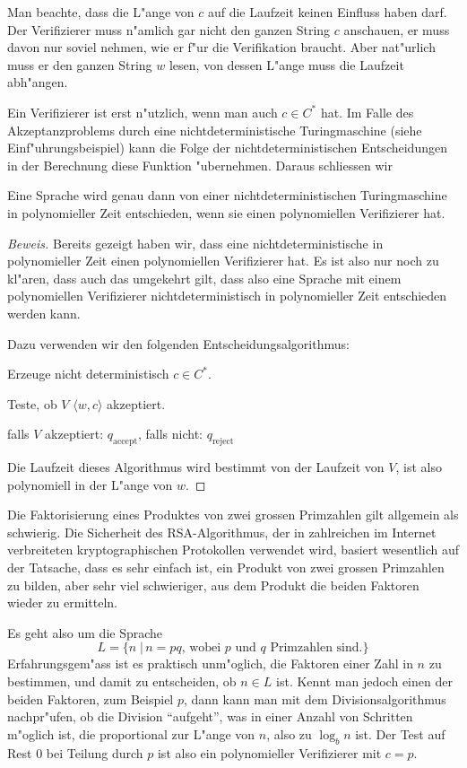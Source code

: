 Man beachte, dass die L"ange von $c$ auf die Laufzeit keinen
Einfluss haben darf. Der Verifizierer muss n"amlich gar nicht
den ganzen String $c$ anschauen, er muss davon nur soviel
nehmen, wie er f"ur die Verifikation braucht. Aber nat"urlich
muss er den ganzen String $w$ lesen, von dessen L"ange muss
die Laufzeit abh"angen.

Ein Verifizierer ist erst n"utzlich, wenn man auch $c\in C^*$
hat. Im Falle des Akzeptanzproblems durch eine nichtdeterministische
Turingmaschine (siehe Einf"uhrungsbeispiel) kann die Folge der
nichtdeterministischen Entscheidungen in der Berechnung diese
Funktion "ubernehmen. Daraus schliessen wir

\begin{satz} Eine Sprache wird genau dann von einer
nichtdeterministischen Turingmaschine in polynomieller Zeit entschieden,
wenn sie einen polynomiellen Verifizierer hat.
\end{satz}

\begin{proof}[Beweis]
Bereits gezeigt haben wir, dass eine nichtdeterministische in
polynomieller Zeit einen polynomiellen Verifizierer hat. Es ist also
nur noch zu kl"aren, dass auch das umgekehrt gilt, dass also eine
Sprache mit einem polynomiellen Verifizierer nichtdeterministisch
in polynomieller Zeit entschieden werden kann.

Dazu verwenden wir den folgenden Entscheidungsalgorithmus:
\begin{compactenum}
\item Erzeuge nicht deterministisch $c\in C^*$.
\item Teste, ob $V$ $\langle w,c\rangle$ akzeptiert.
\item falls $V$ akzeptiert: $q_{\text{accept}}$, falls nicht:
$q_{\text{reject}}$
\end{compactenum}
Die Laufzeit dieses Algorithmus wird bestimmt von der Laufzeit von $V$,
ist also polynomiell in der L"ange von $w$.
\end{proof}

\begin{beispiel}[Faktorisierung]
Die Faktorisierung eines Produktes von zwei grossen Primzahlen
gilt allgemein als schwierig. Die Sicherheit des RSA-Algorithmus,
der in zahlreichen im Internet verbreiteten kryptographischen
Protokollen verwendet wird, basiert wesentlich auf der Tatsache, dass
es sehr einfach ist, ein Produkt von zwei grossen Primzahlen zu
bilden, aber sehr viel schwieriger, aus dem Produkt die beiden
Faktoren wieder zu ermitteln.

Es geht also um die Sprache
\[
L
=
\{
n\;|\,\text{$n=pq$, wobei $p$ und $q$ Primzahlen sind}.
\}
\]
Erfahrungsgem"ass ist es praktisch unm"oglich, die Faktoren
einer Zahl in $n$ zu bestimmen, und damit zu entscheiden, ob
$n\in L$ ist. Kennt man jedoch einen der beiden Faktoren,
zum Beispiel $p$, dann kann man mit dem Divisionsalgorithmus
nachpr"ufen, ob die Division ``aufgeht'', was in einer Anzahl
von Schritten m"oglich ist, die proportional zur L"ange von 
$n$, also zu $\log_b n$ ist. Der Test auf Rest 0 bei Teilung
durch $p$ ist also ein polynomieller Verifizierer mit $c=p$.
\end{beispiel}

